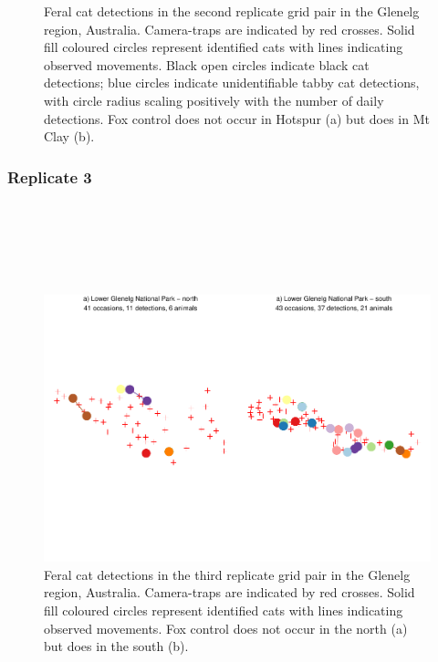 \documentclass[11pt,a4paper,titlepage,twoside,openright]{style/unimelbthesis}
\begin{document}
\begin{mainmatter}
\begin{figure}
{}

\caption{Feral cat detections in the second replicate grid pair in the Glenelg region, Australia. Camera-traps are indicated by red crosses. Solid fill coloured circles represent identified cats with lines indicating observed movements. Black open circles indicate black cat detections; blue circles indicate unidentifiable tabby cat detections, with circle radius scaling positively with the number of daily detections. Fox control does not occur in Hotspur (a) but does in Mt Clay (b).}\label{fig:density-plot-ch-2}
\end{figure}
\newpage

\hypertarget{replicate-3}{%
\subsubsection{Replicate 3}\label{replicate-3}}

\(~\)

\(~\)

\(~\)
\begin{figure}

{\centering \includegraphics[width=1\linewidth]{figure/density-plot-ch-3-1} 

}

\caption{Feral cat detections in the third replicate grid pair in the Glenelg region, Australia. Camera-traps are indicated by red crosses. Solid fill coloured circles represent identified cats with lines indicating observed movements. Fox control does not occur in the north (a) but does in the south (b).}\label{fig:density-plot-ch-3}
\end{figure}
\newpage


\end{mainmatter}
\end{document}
